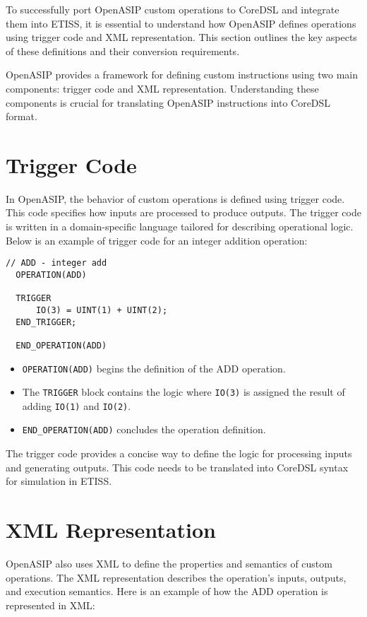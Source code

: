 To successfully port OpenASIP custom operations to CoreDSL and integrate them into ETISS,
it is essential to understand how OpenASIP defines operations using trigger code and XML representation.
This section outlines the key aspects of these definitions and their conversion requirements.

OpenASIP provides a framework for defining custom instructions using two main components: trigger code and XML representation.
Understanding these components is crucial for translating OpenASIP instructions into CoreDSL format.

\section{Trigger Code}

In OpenASIP, the behavior of custom operations is defined using trigger code. This code specifies how inputs are processed to produce outputs.
The trigger code is written in a domain-specific language tailored for describing operational logic.
Below is an example of trigger code for an integer addition operation:

\begin{lstlisting}[caption={The trigger code of ADD}]
  // ADD - integer add
  OPERATION(ADD)

  TRIGGER
      IO(3) = UINT(1) + UINT(2);
  END_TRIGGER;

  END_OPERATION(ADD)
\end{lstlisting}

\begin{itemize}
  \item \texttt{OPERATION(ADD)} begins the definition of the ADD operation.
  \item The \texttt{TRIGGER} block contains the logic where \texttt{IO(3)} is assigned the result of adding \texttt{IO(1)} and \texttt{IO(2)}.
  \item \texttt{END\_OPERATION(ADD)} concludes the operation definition.
\end{itemize}

The trigger code provides a concise way to define the logic for processing inputs and generating outputs.
This code needs to be translated into CoreDSL syntax for simulation in ETISS.

\section{XML Representation}

OpenASIP also uses XML to define the properties and semantics of custom operations.
The XML representation describes the operation's inputs, outputs, and execution semantics.
Here is an example of how the ADD operation is represented in XML:

